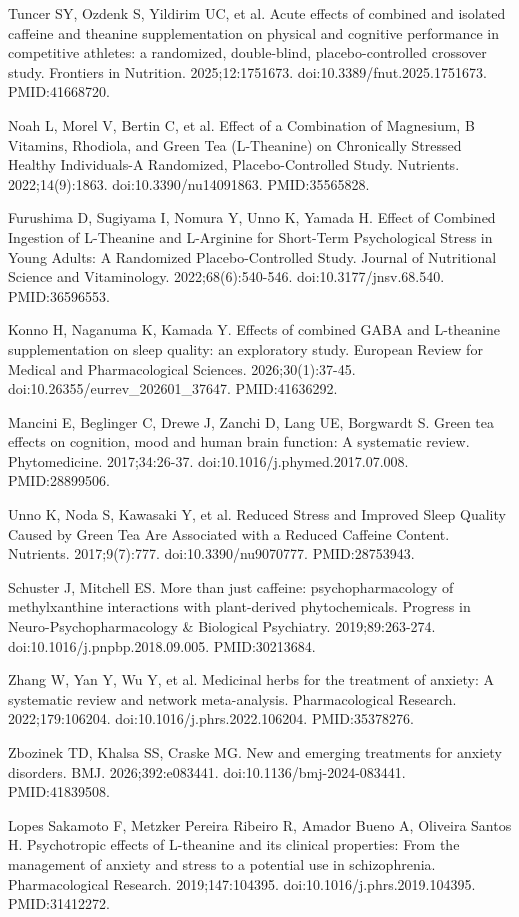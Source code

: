 \documentclass[11pt,oneside]{book}
\newcommand{\reff}[2]{\par\hangindent=7mm\hangafter=1\noindent[#1]\hspace{2mm}#2\par}
\begin{document}
\reff{60}{Tuncer SY, Ozdenk S, Yildirim UC, et al. Acute effects of combined and isolated caffeine and theanine supplementation on physical and cognitive performance in competitive athletes: a randomized, double-blind, placebo-controlled crossover study. Frontiers in Nutrition. 2025;12:1751673. doi:10.3389/fnut.2025.1751673. PMID:41668720.}
\reff{61}{Noah L, Morel V, Bertin C, et al. Effect of a Combination of Magnesium, B Vitamins, Rhodiola, and Green Tea (L-Theanine) on Chronically Stressed Healthy Individuals-A Randomized, Placebo-Controlled Study. Nutrients. 2022;14(9):1863. doi:10.3390/nu14091863. PMID:35565828.}
\reff{62}{Furushima D, Sugiyama I, Nomura Y, Unno K, Yamada H. Effect of Combined Ingestion of L-Theanine and L-Arginine for Short-Term Psychological Stress in Young Adults: A Randomized Placebo-Controlled Study. Journal of Nutritional Science and Vitaminology. 2022;68(6):540-546. doi:10.3177/jnsv.68.540. PMID:36596553.}
\reff{63}{Konno H, Naganuma K, Kamada Y. Effects of combined GABA and L-theanine supplementation on sleep quality: an exploratory study. European Review for Medical and Pharmacological Sciences. 2026;30(1):37-45. doi:10.26355/eurrev\_202601\_37647. PMID:41636292.}
\reff{64}{Mancini E, Beglinger C, Drewe J, Zanchi D, Lang UE, Borgwardt S. Green tea effects on cognition, mood and human brain function: A systematic review. Phytomedicine. 2017;34:26-37. doi:10.1016/j.phymed.2017.07.008. PMID:28899506.}
\reff{65}{Unno K, Noda S, Kawasaki Y, et al. Reduced Stress and Improved Sleep Quality Caused by Green Tea Are Associated with a Reduced Caffeine Content. Nutrients. 2017;9(7):777. doi:10.3390/nu9070777. PMID:28753943.}
\reff{66}{Schuster J, Mitchell ES. More than just caffeine: psychopharmacology of methylxanthine interactions with plant-derived phytochemicals. Progress in Neuro-Psychopharmacology \& Biological Psychiatry. 2019;89:263-274. doi:10.1016/j.pnpbp.2018.09.005. PMID:30213684.}
\reff{67}{Zhang W, Yan Y, Wu Y, et al. Medicinal herbs for the treatment of anxiety: A systematic review and network meta-analysis. Pharmacological Research. 2022;179:106204. doi:10.1016/j.phrs.2022.106204. PMID:35378276.}
\reff{68}{Zbozinek TD, Khalsa SS, Craske MG. New and emerging treatments for anxiety disorders. BMJ. 2026;392:e083441. doi:10.1136/bmj-2024-083441. PMID:41839508.}
\reff{69}{Lopes Sakamoto F, Metzker Pereira Ribeiro R, Amador Bueno A, Oliveira Santos H. Psychotropic effects of L-theanine and its clinical properties: From the management of anxiety and stress to a potential use in schizophrenia. Pharmacological Research. 2019;147:104395. doi:10.1016/j.phrs.2019.104395. PMID:31412272.}
\end{document}

